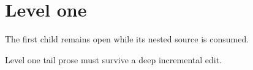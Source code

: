 \section*{Level one}
The first child remains open while its nested source is consumed.

\newpage


\newpage
Level one tail prose must survive a deep incremental edit.
